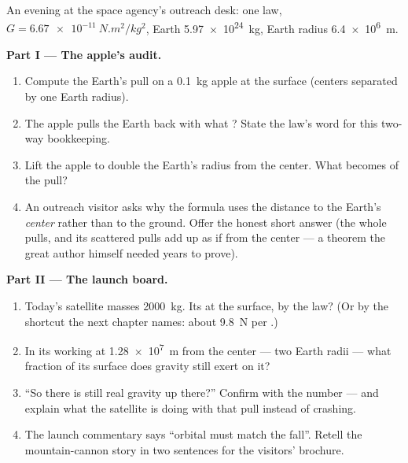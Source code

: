 \begin{problem}\label{pb:g9:gravitation:1}
An evening at the space agency's outreach desk: one law,
$G = \qty{6.67e-11}{N.m^2/kg^2}$, Earth 
\qty{5.97e24}{kg}, Earth radius \qty{6.4e6}{m}.

\medskip\noindent\textbf{Part I --- The apple's audit.}
\begin{enumerate}
  \item Compute the Earth's pull on a \qty{0.1}{kg} apple at
        the surface (centers separated by one Earth radius).
  \item The apple pulls the Earth back with what ?
        State the law's word for this two-way bookkeeping.
  \item Lift the apple to double the Earth's radius from the
        center. What becomes of the pull?
  \item An outreach visitor asks why the formula uses the
        distance to the Earth's \emph{center} rather than to
        the ground. Offer the honest short answer (the whole
         pulls, and its scattered pulls add up as if
        from the center --- a theorem the great author
        himself needed years to prove).
\end{enumerate}

\medskip\noindent\textbf{Part II --- The launch board.}
\begin{enumerate}[resume]
  \item Today's satellite masses \qty{2000}{kg}. Its 
        at the surface, by the law? (Or by the shortcut the
        next chapter names: about \qty{9.8}{N} per
        .)
  \item In its working  at \qty{1.28e7}{m} from the
        center --- two Earth radii --- what fraction of its
        surface  does gravity still exert on it?
  \item ``So there is still real gravity up there?''
        Confirm with the number --- and explain what the
        satellite is doing with that pull instead of
        crashing.
  \item The launch commentary says ``orbital  must
        match the fall''. Retell the mountain-cannon story
        in two sentences for the visitors' brochure.
\end{enumerate}


\end{problem}
